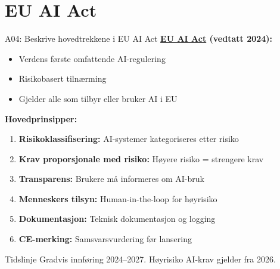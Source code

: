\documentclass[aspectratio=169, 10pt]{beamer}
\begin{document}
\section{EU AI Act}

\begin{frame}{A04: Beskrive hovedtrekkene i EU AI Act}
    \textbf{\href{https://artificialintelligenceact.eu/}{EU AI Act} (vedtatt 2024):}
    \begin{itemize}
        \item Verdens første omfattende AI-regulering
        \item Risikobasert tilnærming
        \item Gjelder alle som tilbyr eller bruker AI i EU
    \end{itemize}
    
    \vspace{0.3cm}
    \textbf{Hovedprinsipper:}
    \begin{enumerate}
        \item \textbf{Risikoklassifisering:} AI-systemer kategoriseres etter risiko
        \item \textbf{Krav proporsjonale med risiko:} Høyere risiko = strengere krav
        \item \textbf{Transparens:} Brukere må informeres om AI-bruk
        \item \textbf{Menneskers tilsyn:} Human-in-the-loop for høyrisiko
        \item \textbf{Dokumentasjon:} Teknisk dokumentasjon og logging
        \item \textbf{CE-merking:} Samsvarsvurdering før lansering
    \end{enumerate}
    
    \vspace{0.3cm}
    \begin{block}{Tidslinje}
        Gradvis innføring 2024--2027. Høyrisiko AI-krav gjelder fra 2026.
    \end{block}
\end{frame}
\end{document}
